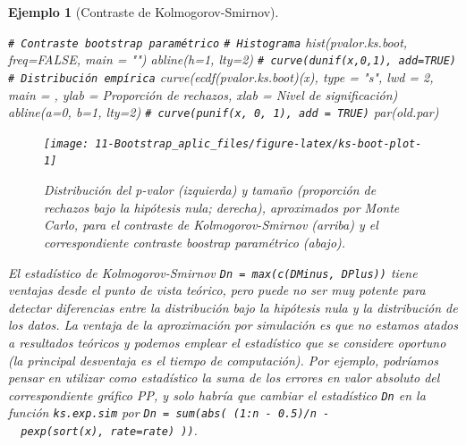 \documentclass[
  10pt,
]{book}
\newenvironment{Shaded}{\begin{snugshade}}{\end{snugshade}}
\newcommand{\AttributeTok}[1]{\textcolor[rgb]{0.77,0.63,0.00}{#1}}
\newcommand{\CommentTok}[1]{\textcolor[rgb]{0.56,0.35,0.01}{\textit{#1}}}
\newcommand{\ConstantTok}[1]{\textcolor[rgb]{0.00,0.00,0.00}{#1}}
\newcommand{\DecValTok}[1]{\textcolor[rgb]{0.00,0.00,0.81}{#1}}
\newcommand{\FunctionTok}[1]{\textcolor[rgb]{0.00,0.00,0.00}{#1}}
\newcommand{\NormalTok}[1]{#1}
\newcommand{\StringTok}[1]{\textcolor[rgb]{0.31,0.60,0.02}{#1}}
\theoremstyle{break}
\newtheorem{example}{Ejemplo}[chapter]
\theoremstyle{nonumberplain}
\renewcommand{\CommentTok}[1]{\textcolor[rgb]{0.41,0.41,0.41}{\texttt{#1}}}
\begin{document}
\begin{example}[Contraste de Kolmogorov-Smirnov]
\begin{Shaded}
\begin{Highlighting}[]
\CommentTok{\# Contraste bootstrap paramétrico}
  \CommentTok{\# Histograma}
\FunctionTok{hist}\NormalTok{(pvalor.ks.boot, }\AttributeTok{freq=}\ConstantTok{FALSE}\NormalTok{, }\AttributeTok{main =} \StringTok{""}\NormalTok{)}
\FunctionTok{abline}\NormalTok{(}\AttributeTok{h=}\DecValTok{1}\NormalTok{, }\AttributeTok{lty=}\DecValTok{2}\NormalTok{)   }\CommentTok{\# curve(dunif(x,0,1), add=TRUE)}
  \CommentTok{\# Distribución empírica}
\FunctionTok{curve}\NormalTok{(}\FunctionTok{ecdf}\NormalTok{(pvalor.ks.boot)(x), }\AttributeTok{type =} \StringTok{"s"}\NormalTok{, }\AttributeTok{lwd =} \DecValTok{2}\NormalTok{, }\AttributeTok{main =} \StringTok{\textquotesingle{}\textquotesingle{}}\NormalTok{, }
      \AttributeTok{ylab =} \StringTok{\textquotesingle{}Proporción de rechazos\textquotesingle{}}\NormalTok{,  }\AttributeTok{xlab =} \StringTok{\textquotesingle{}Nivel de significación\textquotesingle{}}\NormalTok{)}
\FunctionTok{abline}\NormalTok{(}\AttributeTok{a=}\DecValTok{0}\NormalTok{, }\AttributeTok{b=}\DecValTok{1}\NormalTok{, }\AttributeTok{lty=}\DecValTok{2}\NormalTok{)   }\CommentTok{\# curve(punif(x, 0, 1), add = TRUE)}
\FunctionTok{par}\NormalTok{(old.par)}
\end{Highlighting}
\end{Shaded}

\begin{figure}[!htbp]

{\centering \texttt{[image: 11-Bootstrap\_aplic\_files/figure-latex/ks-boot-plot-1]} 

}

\caption{Distribución del p-valor (izquierda) y tamaño (proporción de rechazos bajo la hipótesis nula; derecha), aproximados por  Monte Carlo, para el contraste de Kolmogorov-Smirnov (arriba) y el correspondiente contraste boostrap paramétrico (abajo).}\label{fig:ks-boot-plot}
\end{figure}

El estadístico de Kolmogorov-Smirnov \texttt{Dn\ =\ max(c(DMinus,\ DPlus))} tiene ventajas desde el
punto de vista teórico, pero puede no ser muy potente para detectar diferencias entre la
distribución bajo la hipótesis nula y la distribución de los datos.
La ventaja de la aproximación por simulación es que no estamos atados a resultados teóricos
y podemos emplear el estadístico que se considere oportuno
(la principal desventaja es el tiempo de computación).
Por ejemplo, podríamos pensar en utilizar como estadístico la suma de los errores en
valor absoluto del correspondiente gráfico PP, y solo habría que cambiar el estadístico
\texttt{Dn} en la función \texttt{ks.exp.sim} por \texttt{Dn\ =\ sum(abs(\ (1:n\ -\ 0.5)/n\ -\ \ pexp(sort(x),\ rate=rate)\ ))}.
\end{example}
\end{document}
